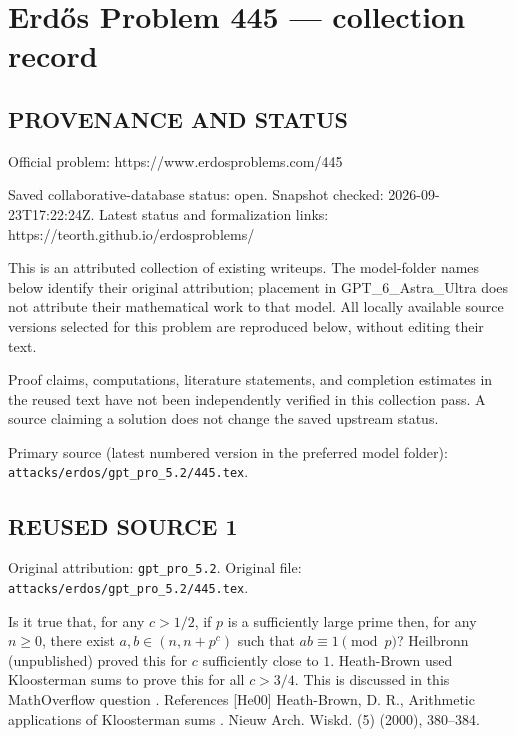 \section*{Erd\H{o}s Problem 445 --- collection record}

\subsection*{PROVENANCE AND STATUS}
Official problem: https://www.erdosproblems.com/445

Saved collaborative-database status: open.
Snapshot checked: 2026-09-23T17:22:24Z.
Latest status and formalization links: https://teorth.github.io/erdosproblems/

This is an attributed collection of existing writeups. The model-folder names below identify their original attribution; placement in GPT\_6\_Astra\_Ultra does not attribute their mathematical work to that model. All locally available source versions selected for this problem are reproduced below, without editing their text.

Proof claims, computations, literature statements, and completion estimates in the reused text have not been independently verified in this collection pass. A source claiming a solution does not change the saved upstream status.

Primary source (latest numbered version in the preferred model folder): \texttt{attacks/erdos/gpt\_pro\_5.2/445.tex}.

\subsection*{REUSED SOURCE 1}
Original attribution: \texttt{gpt\_pro\_5.2}.
Original file: \texttt{attacks/erdos/gpt\_pro\_5.2/445.tex}.


Is it true that, for any $c>1/2$, if $p$ is a sufficiently large prime then, for any $n\geq 0$, there exist $a,b\in(n,n+p^c)$ such that $ab\equiv 1\pmod{p}$? Heilbronn (unpublished) proved this for $c$ sufficiently close to $1$. Heath-Brown \cite{He00} used Kloosterman sums to prove this for all $c>3/4$. This is discussed in this MathOverflow question . References [He00] Heath-Brown, D. R., Arithmetic applications of {K}loosterman sums . Nieuw Arch. Wiskd. (5) (2000), 380--384.


